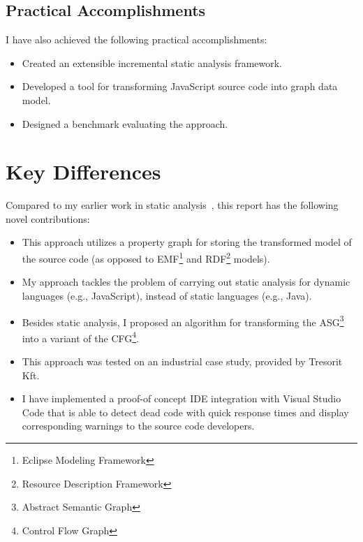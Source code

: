 \subsection{Practical Accomplishments}
I have also achieved the following practical accomplishments:

\begin{itemize}[topsep=0pt]
	\item Created an extensible incremental static analysis framework.
	\item Developed a tool for transforming JavaScript source code into graph data model.
	\item Designed a benchmark evaluating the approach.
\end{itemize}

\section{Key Differences}
Compared to my earlier work in static analysis~\cite{stein-daniel-tdk,stein-daniel-bsc,stein-daniel-ttc}, this report has the following novel contributions:

\begin{itemize}[topsep=0pt]
	\item This approach utilizes a property graph for storing the transformed model of the source code (as opposed to EMF\footnote{Eclipse Modeling Framework} and RDF\footnote{Resource Description Framework} models).

	\item My approach tackles the problem of carrying out static analysis for dynamic languages (e.g., JavaScript), instead of static languages (e.g., Java).

	\item Besides static analysis, I proposed an algorithm for transforming the ASG\footnote{Abstract Semantic Graph} into a variant of the CFG\footnote{Control Flow Graph}.

	\item This approach was tested on an industrial case study, provided by Tresorit Kft.

	\item I have implemented a proof-of concept IDE integration with Visual Studio Code that is able to detect dead code with quick response times and display corresponding warnings to the source code developers.
\end{itemize}
